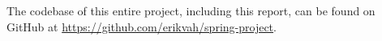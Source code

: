 The codebase of this entire project, including this report, can be found on GitHub at \url{https://github.com/erikvah/spring-project}. 